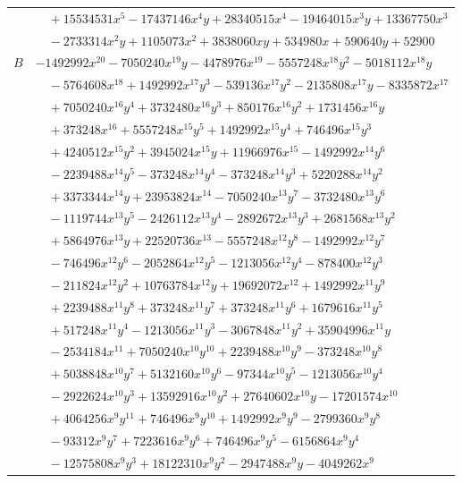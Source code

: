 \documentclass[11pt]{article}
\begin{document}
\begin{longtable}{@{}ll@{}}
 & $\quad +15534531x^{5}-17437146x^{4}y+28340515x^{4}-19464015x^{3}y+13367750x^{3}$\\
 & $\quad -2733314x^{2}y+1105073x^{2}+3838060xy+534980x+590640y+52900$\\
$B$ & $-1492992x^{20}-7050240x^{19}y-4478976x^{19}-5557248x^{18}y^{2}-5018112x^{18}y$\\
 & $\quad -5764608x^{18}+1492992x^{17}y^{3}-539136x^{17}y^{2}-2135808x^{17}y-8335872x^{17}$\\
 & $\quad +7050240x^{16}y^{4}+3732480x^{16}y^{3}+850176x^{16}y^{2}+1731456x^{16}y$\\
 & $\quad +373248x^{16}+5557248x^{15}y^{5}+1492992x^{15}y^{4}+746496x^{15}y^{3}$\\
 & $\quad +4240512x^{15}y^{2}+3945024x^{15}y+11966976x^{15}-1492992x^{14}y^{6}$\\
 & $\quad -2239488x^{14}y^{5}-373248x^{14}y^{4}-373248x^{14}y^{3}+5220288x^{14}y^{2}$\\
 & $\quad +3373344x^{14}y+23953824x^{14}-7050240x^{13}y^{7}-3732480x^{13}y^{6}$\\
 & $\quad -1119744x^{13}y^{5}-2426112x^{13}y^{4}-2892672x^{13}y^{3}+2681568x^{13}y^{2}$\\
 & $\quad +5864976x^{13}y+22520736x^{13}-5557248x^{12}y^{8}-1492992x^{12}y^{7}$\\
 & $\quad -746496x^{12}y^{6}-2052864x^{12}y^{5}-1213056x^{12}y^{4}-878400x^{12}y^{3}$\\
 & $\quad -211824x^{12}y^{2}+10763784x^{12}y+19692072x^{12}+1492992x^{11}y^{9}$\\
 & $\quad +2239488x^{11}y^{8}+373248x^{11}y^{7}+373248x^{11}y^{6}+1679616x^{11}y^{5}$\\
 & $\quad +517248x^{11}y^{4}-1213056x^{11}y^{3}-3067848x^{11}y^{2}+35904996x^{11}y$\\
 & $\quad -2534184x^{11}+7050240x^{10}y^{10}+2239488x^{10}y^{9}-373248x^{10}y^{8}$\\
 & $\quad +5038848x^{10}y^{7}+5132160x^{10}y^{6}-97344x^{10}y^{5}-1213056x^{10}y^{4}$\\
 & $\quad -2922624x^{10}y^{3}+13592916x^{10}y^{2}+27640602x^{10}y-17201574x^{10}$\\
 & $\quad +4064256x^{9}y^{11}+746496x^{9}y^{10}+1492992x^{9}y^{9}-2799360x^{9}y^{8}$\\
 & $\quad -93312x^{9}y^{7}+7223616x^{9}y^{6}+746496x^{9}y^{5}-6156864x^{9}y^{4}$\\
 & $\quad -12575808x^{9}y^{3}+18122310x^{9}y^{2}-2947488x^{9}y-4049262x^{9}$\\

\end{longtable}
\end{document}
